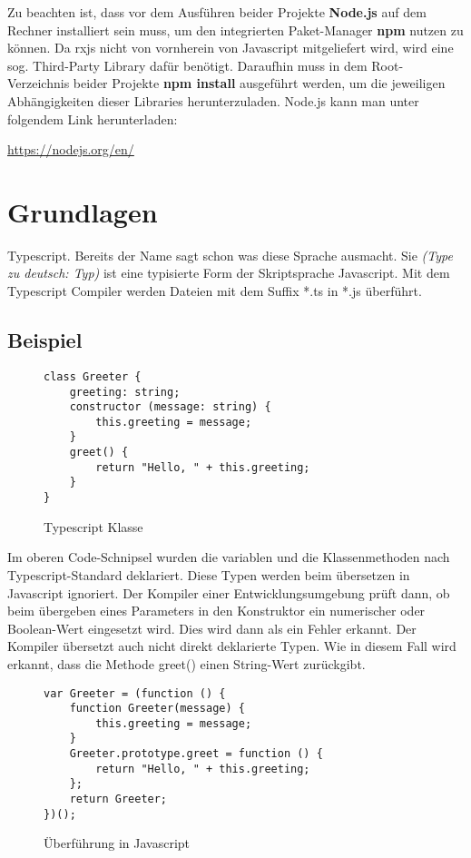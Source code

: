 \noindent
Zu beachten ist, dass vor dem Ausführen beider Projekte \textbf{Node.js} auf dem Rechner installiert sein muss, um den integrierten Paket-Manager \textbf{npm} nutzen zu können. Da rxjs nicht von vornherein von Javascript mitgeliefert wird, wird eine sog. \glqq  Third-Party Library\grqq{} dafür benötigt. Daraufhin muss in dem Root-Verzeichnis beider Projekte \textbf{npm install} ausgeführt werden, um die jeweiligen Abhängigkeiten dieser Libraries herunterzuladen. Node.js kann man unter folgendem Link herunterladen:

\begin{center}
\url{https://nodejs.org/en/}
\end{center}

\section{Grundlagen}

Typescript. Bereits der Name sagt schon was diese Sprache ausmacht. Sie \textit{(\glqq{}Type\grqq{} zu deutsch: Typ)} ist eine typisierte Form der Skriptsprache Javascript. Mit dem Typescript Compiler werden Dateien mit dem Suffix *.ts in *.js überführt.

\subsection{Beispiel}

\begin{figure}[H]
\begin{lstlisting}
class Greeter {
    greeting: string;
    constructor (message: string) {
        this.greeting = message;
    }
    greet() {
        return "Hello, " + this.greeting;
    }
}  
\end{lstlisting}
\caption{Typescript Klasse \cite{typescript-example}}
\end{figure}

\noindent
Im oberen Code-Schnipsel wurden die variablen und die Klassenmethoden nach Typescript-Standard deklariert. Diese Typen werden beim übersetzen in Javascript ignoriert. Der Kompiler einer Entwicklungsumgebung prüft dann, ob beim übergeben eines Parameters in den Konstruktor ein numerischer oder Boolean-Wert eingesetzt wird. Dies wird dann als ein Fehler erkannt. Der Kompiler übersetzt auch nicht direkt deklarierte Typen. Wie in diesem Fall wird erkannt, dass die Methode greet() einen String-Wert zurückgibt.

\begin{figure}[H]
\begin{lstlisting}
var Greeter = (function () {
    function Greeter(message) {
        this.greeting = message;
    }
    Greeter.prototype.greet = function () {
        return "Hello, " + this.greeting;
    };
    return Greeter;
})(); 
\end{lstlisting}
\caption{Überführung in Javascript \cite{typescript-example}}
\end{figure}

